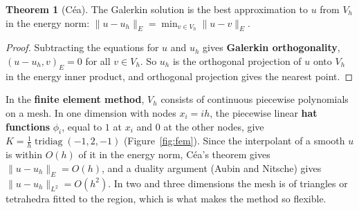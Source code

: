 \documentclass[11pt,a4paper]{article}
\numberwithin{equation}{section}
\theoremstyle{definition}
\newtheorem{thm}{Theorem}[subsection]
\begin{document}
\begin{thm}[C\'ea]
\label{thm:cea}
The Galerkin solution is the best approximation to $u$ from $V_h$ in the energy norm: $\|u - u_h\|_E = \min_{v \in V_h}\|u - v\|_E$.
\end{thm}

\begin{proof}
Subtracting the equations for $u$ and $u_h$ gives \textbf{Galerkin orthogonality}, $(u - u_h, v)_E = 0$ for all $v \in V_h$. So $u_h$ is the orthogonal projection of $u$ onto $V_h$ in the energy inner product, and orthogonal projection gives the nearest point.
\end{proof}

In the \textbf{finite element method}, $V_h$ consists of continuous piecewise polynomials on a mesh. In one dimension with nodes $x_i = ih$, the piecewise linear \textbf{hat functions} $\phi_i$, equal to $1$ at $x_i$ and $0$ at the other nodes, give $K = \frac1h\operatorname{tridiag}(-1, 2, -1)$ (Figure~\ref{fig:fem}). Since the
interpolant of a smooth $u$ is within $O(h)$ of it in the energy norm, C\'ea's theorem gives $\|u - u_h\|_E = O(h)$, and a duality argument (Aubin and Nitsche) gives $\|u - u_h\|_{L^2} = O(h^2)$. In two and three dimensions the mesh is of triangles or tetrahedra fitted to the region, which is what makes the method
so flexible.
\end{document}
